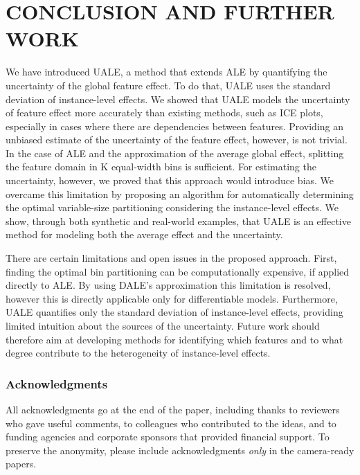 \documentclass[twoside]{article}
\begin{document}
\section{CONCLUSION AND FURTHER WORK}

We have introduced UALE, a method that extends ALE by quantifying the uncertainty of the global feature effect. To do that, UALE uses the standard deviation of instance-level effects. We showed that UALE models the uncertainty of feature effect more accurately than existing methods, such as ICE plots, especially in cases where there are dependencies between features. Providing an unbiased estimate of the uncertainty of the feature effect, however, is not trivial. In the case of ALE and the approximation of the average global effect, splitting the feature domain in K equal-width bins is sufficient. For estimating the uncertainty, however, we proved that this approach would introduce bias. We overcame this limitation by proposing an algorithm for automatically determining the optimal variable-size partitioning considering the instance-level effects. We show, through both synthetic and real-world examples, that UALE is an effective method for modeling both the average effect and the uncertainty.

There are certain limitations and open issues in the proposed approach. First, finding the optimal bin partitioning can be computationally expensive, if applied directly to ALE. By using DALE's approximation this limitation is resolved, however this is directly applicable only for differentiable models. Furthermore, UALE quantifies only the standard deviation of instance-level effects, providing limited intuition about the sources of the uncertainty. Future work should therefore aim at developing methods for identifying which features and to what degree contribute to the heterogeneity of instance-level effects.



\clearpage
\subsubsection*{Acknowledgments}
All acknowledgments go at the end of the paper, including thanks to reviewers who gave useful comments, to colleagues who contributed to the ideas, and to funding agencies and corporate sponsors that provided financial support. 
To preserve the anonymity, please include acknowledgments \emph{only} in the camera-ready papers.


\end{document}
